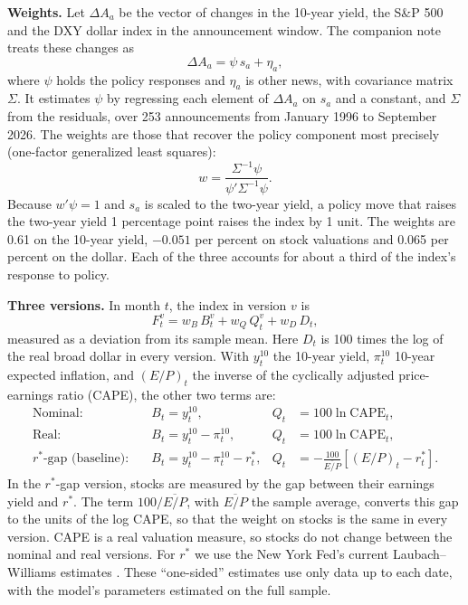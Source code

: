\documentclass[11pt]{article}
\newcommand{\rs}{r^{*}}
\begin{document}
\textbf{Weights.} Let $\Delta A_a$ be the vector of changes in the 10-year yield, the S\&P 500 and the DXY dollar index in the announcement window. The companion note treats these changes as
\begin{equation}
\Delta A_a = \psi\, s_a + \eta_a, \label{eq:window}
\end{equation}
where $\psi$ holds the policy responses and $\eta_a$ is other news, with covariance matrix $\Sigma$. It estimates $\psi$ by regressing each element of $\Delta A_a$ on $s_a$ and a constant, and $\Sigma$ from the residuals, over 253 announcements from January 1996 to September 2026. The weights are those that recover the policy component most precisely (one-factor generalized least squares):
\begin{equation}
w = \frac{\Sigma^{-1}\psi}{\psi'\Sigma^{-1}\psi}. \label{eq:weights}
\end{equation}
Because $w'\psi=1$ and $s_a$ is scaled to the two-year yield, a policy move that raises the two-year yield 1 percentage point raises the index by 1 unit. The weights are 0.61 on the 10-year yield, $-0.051$ per percent on stock valuations and 0.065 per percent on the dollar. Each of the three accounts for about a third of the index's response to policy.

\textbf{Three versions.} In month $t$, the index in version $v$ is
\begin{equation}
F_t^{v} = w_B\, B_t^{v} + w_Q\, Q_t^{v} + w_D\, D_t, \label{eq:fci}
\end{equation}
measured as a deviation from its sample mean. Here $D_t$ is 100 times the log of the real broad dollar in every version. With $y^{10}_t$ the 10-year yield, $\pi^{10}_t$ 10-year expected inflation, and $(E/P)_t$ the inverse of the cyclically adjusted price-earnings ratio (CAPE), the other two terms are:
\begin{align}
\text{Nominal:}\quad & B_t = y^{10}_t, & Q_t &= 100\ln \text{CAPE}_t, \label{eq:nom}\\
\text{Real:}\quad & B_t = y^{10}_t - \pi^{10}_t, & Q_t &= 100\ln \text{CAPE}_t, \label{eq:real}\\
\text{$\rs$-gap (baseline):}\quad & B_t = y^{10}_t - \pi^{10}_t - \rs_t, & Q_t &= -\frac{100}{\overline{E/P}}\left[(E/P)_t - \rs_t\right]. \label{eq:rstar}
\end{align}
In the $\rs$-gap version, stocks are measured by the gap between their earnings yield and $\rs$. The term $100/\overline{E/P}$, with $\overline{E/P}$ the sample average, converts this gap to the units of the log CAPE, so that the weight on stocks is the same in every version. CAPE is a real valuation measure, so stocks do not change between the nominal and real versions. For $\rs$ we use the New York Fed's current Laubach--Williams estimates \citep{holston2023}. These ``one-sided'' estimates use only data up to each date, with the model's parameters estimated on the full sample.
\end{document}
